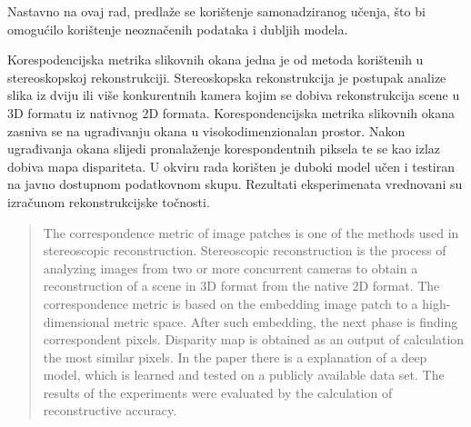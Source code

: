 \documentclass[times, utf8, zavrsni, numeric]{fer}
\begin{document}
Nastavno na ovaj rad, predlaže se korištenje samonadziranog učenja, što bi omogućilo korištenje neoznačenih podataka i dubljih modela.




\begin{sazetak}
Korespodencijska metrika slikovnih okana jedna je od metoda korištenih u \\stereoskopskoj rekonstrukciji. Stereoskopska rekonstrukcija je postupak analize slika iz dviju ili više konkurentnih kamera kojim se dobiva rekonstrukcija scene u 3D formatu iz nativnog 2D formata. Korespondencijska metrika slikovnih okana zasniva se na ugrađivanju okana u visokodimenzionalan prostor. Nakon ugrađivanja okana slijedi pronalaženje korespondentnih piksela te se kao izlaz dobiva mapa dispariteta. U okviru rada korišten je duboki model učen i testiran na javno dostupnom podatkovnom skupu. Rezultati eksperimenata vrednovani su izračunom rekonstrukcijske točnosti.

\end{sazetak}

\begin{abstract}
The correspondence metric of image patches is one of the methods used in stereoscopic reconstruction. Stereoscopic reconstruction is the process of analyzing images from two or more concurrent cameras to obtain a reconstruction of a scene in 3D format from the native 2D format. The correspondence metric is based on the embedding
image patch to a high-dimensional metric space. After such embedding, the next phase is finding correspondent pixels. Disparity map is obtained as an output of calculation the most similar pixels.  In the paper there is a explanation of a deep model, which is learned and tested on a publicly available data set. The results of the experiments were evaluated by the calculation of reconstructive accuracy.

\end{abstract}
\end{document}
